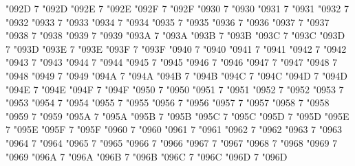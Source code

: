 \Umathcode "092D 7 \symoperators "092D%
\Umathcode "092E 7 \symoperators "092E%
\Umathcode "092F 7 \symoperators "092F%
%
\Umathcode "0930 7 \symoperators "0930%
\Umathcode "0931 7 \symoperators "0931%
\Umathcode "0932 7 \symoperators "0932%
\Umathcode "0933 7 \symoperators "0933%
\Umathcode "0934 7 \symoperators "0934%
\Umathcode "0935 7 \symoperators "0935%
\Umathcode "0936 7 \symoperators "0936%
\Umathcode "0937 7 \symoperators "0937%
\Umathcode "0938 7 \symoperators "0938%
\Umathcode "0939 7 \symoperators "0939%
\Umathcode "093A 7 \symoperators "093A%
\Umathcode "093B 7 \symoperators "093B%
\Umathcode "093C 7 \symoperators "093C%
\Umathcode "093D 7 \symoperators "093D%
\Umathcode "093E 7 \symoperators "093E%
\Umathcode "093F 7 \symoperators "093F%
%
\Umathcode "0940 7 \symoperators "0940%
\Umathcode "0941 7 \symoperators "0941%
\Umathcode "0942 7 \symoperators "0942%
\Umathcode "0943 7 \symoperators "0943%
\Umathcode "0944 7 \symoperators "0944%
\Umathcode "0945 7 \symoperators "0945%
\Umathcode "0946 7 \symoperators "0946%
\Umathcode "0947 7 \symoperators "0947%
\Umathcode "0948 7 \symoperators "0948%
\Umathcode "0949 7 \symoperators "0949%
\Umathcode "094A 7 \symoperators "094A%
\Umathcode "094B 7 \symoperators "094B%
\Umathcode "094C 7 \symoperators "094C%
\Umathcode "094D 7 \symoperators "094D%
\Umathcode "094E 7 \symoperators "094E%
\Umathcode "094F 7 \symoperators "094F%
%
\Umathcode "0950 7 \symoperators "0950%
\Umathcode "0951 7 \symoperators "0951%
\Umathcode "0952 7 \symoperators "0952%
\Umathcode "0953 7 \symoperators "0953%
\Umathcode "0954 7 \symoperators "0954%
\Umathcode "0955 7 \symoperators "0955%
\Umathcode "0956 7 \symoperators "0956%
\Umathcode "0957 7 \symoperators "0957%
\Umathcode "0958 7 \symoperators "0958%
\Umathcode "0959 7 \symoperators "0959%
\Umathcode "095A 7 \symoperators "095A%
\Umathcode "095B 7 \symoperators "095B%
\Umathcode "095C 7 \symoperators "095C%
\Umathcode "095D 7 \symoperators "095D%
\Umathcode "095E 7 \symoperators "095E%
\Umathcode "095F 7 \symoperators "095F%
%
\Umathcode "0960 7 \symoperators "0960%
\Umathcode "0961 7 \symoperators "0961%
\Umathcode "0962 7 \symoperators "0962%
\Umathcode "0963 7 \symoperators "0963%
\Umathcode "0964 7 \symoperators "0964%
\Umathcode "0965 7 \symoperators "0965%
\Umathcode "0966 7 \symoperators "0966%
\Umathcode "0967 7 \symoperators "0967%
\Umathcode "0968 7 \symoperators "0968%
\Umathcode "0969 7 \symoperators "0969%
\Umathcode "096A 7 \symoperators "096A%
\Umathcode "096B 7 \symoperators "096B%
\Umathcode "096C 7 \symoperators "096C%
\Umathcode "096D 7 \symoperators "096D%
